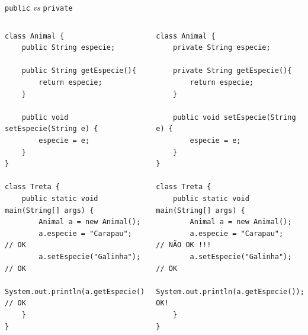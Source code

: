\documentclass[portuguese, aspectratio=169, xcolor=table]{beamer}
\begin{document}
\begin{frame}[fragile]{\texttt{public} \textit{vs} \texttt{private}}
\begin{columns}
\begin{verbatim}
class Animal {
    public String especie;

    public String getEspecie(){
        return especie;
    }

    public void setEspecie(String e) {
        especie = e;
    }
}

class Treta {
    public static void main(String[] args) {
        Animal a = new Animal();
        a.especie = "Carapau";              // OK
        a.setEspecie("Galinha");            // OK
        System.out.println(a.getEspecie()); // OK
    }
}
\end{verbatim}

\begin{verbatim}
class Animal {
    private String especie;

    private String getEspecie(){
        return especie;
    }

    public void setEspecie(String e) {
        especie = e;
    }
}

class Treta {
    public static void main(String[] args) {
        Animal a = new Animal();
        a.especie = "Carapau";     // NÃO OK !!!
        a.setEspecie("Galinha");   // OK
        System.out.println(a.getEspecie());//NÃO OK!
    }
}
\end{verbatim}
\end{columns}
\end{frame}
\end{document}
